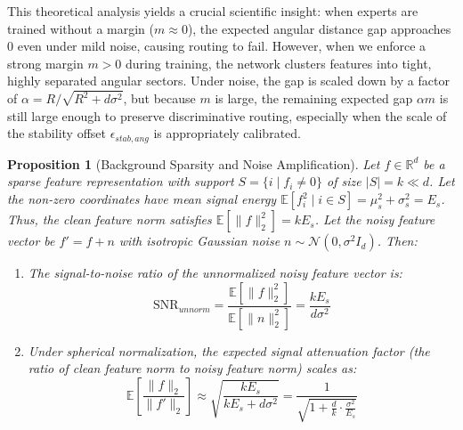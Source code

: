 \documentclass{article}
\theoremstyle{plain}
\newtheorem{proposition}[theorem]{Proposition}
\theoremstyle{definition}
\theoremstyle{remark}
\begin{document}
This theoretical analysis yields a crucial scientific insight: when experts are trained without a margin ($m \approx 0$), the expected angular distance gap approaches $0$ even under mild noise, causing routing to fail. However, when we enforce a strong margin $m > 0$ during training, the network clusters features into tight, highly separated angular sectors. Under noise, the gap is scaled down by a factor of $\alpha = R/\sqrt{R^2 + d \sigma^2}$, but because $m$ is large, the remaining expected gap $\alpha m$ is still large enough to preserve discriminative routing, especially when the scale of the stability offset $\epsilon_{stab,ang}$ is appropriately calibrated.

\begin{proposition}[Background Sparsity and Noise Amplification]
Let $f \in \mathbb{R}^d$ be a sparse feature representation with support $S = \{i \mid f_i \neq 0\}$ of size $|S| = k \ll d$. Let the non-zero coordinates have mean signal energy $\mathbb{E}[f_i^2 \mid i \in S] = \mu_s^2 + \sigma_s^2 = E_s$. Thus, the clean feature norm satisfies $\mathbb{E}[\|f\|_2^2] = k E_s$. Let the noisy feature vector be $f' = f + n$ with isotropic Gaussian noise $n \sim \mathcal{N}(0, \sigma^2 I_d)$. Then:
\begin{enumerate}
    \item The signal-to-noise ratio of the unnormalized noisy feature vector is:
    \begin{equation}
    \text{SNR}_{unnorm} = \frac{\mathbb{E}[\|f\|_2^2]}{\mathbb{E}[\|n\|_2^2]} = \frac{k E_s}{d \sigma^2}
    \end{equation}
    \item Under spherical normalization, the expected signal attenuation factor (the ratio of clean feature norm to noisy feature norm) scales as:
    \begin{equation}
    \mathbb{E}\left[\frac{\|f\|_2}{\|f'\|_2}\right] \approx \sqrt{\frac{k E_s}{k E_s + d \sigma^2}} = \frac{1}{\sqrt{1 + \frac{d}{k} \cdot \frac{\sigma^2}{E_s}}}
    \end{equation}
\end{enumerate}
\end{proposition}
\end{document}
